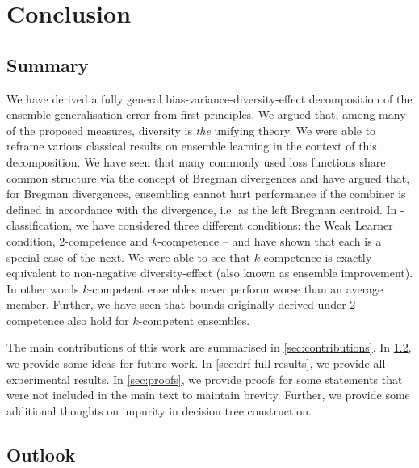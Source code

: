 \documentclass[
	twoside=false, %
]{kaobook}
\begin{document}
\chapter{Conclusion}

\section{Summary}

We have derived a fully general bias-variance-diversity-effect decomposition of the ensemble generalisation error from first principles. 
We argued that, among many of the proposed measures, diversity is \textit{the} unifying theory.
We were able to reframe various classical results on ensemble learning in the context of this decomposition. 
We have seen that many commonly used loss functions share common structure via the concept of Bregman divergences and have argued that, for Bregman divergences, ensembling cannot hurt performance if the combiner is defined in accordance with the divergence, i.e. as the left Bregman centroid. In \zeroone-classification, we have considered three different conditions: the Weak Learner condition, $2$-competence and $k$-competence -- and have shown that each is a special case of the next. We were able to see that $k$-competence is exactly equivalent to non-negative diversity-effect (also known as ensemble improvement). In other words $k$-competent ensembles never perform worse than an average member. Further, we have seen that bounds originally derived under $2$-competence also hold for $k$-competent ensembles. 

The main contributions of this work are summarised in \cref{sec:contributions}. In \cref{sec:outlook}, we provide some ideas for future work. In \cref{sec:drf-full-results}, we provide all experimental results. In \cref{sec:proofs}, we provide proofs for some statements that were not included in the main text to maintain brevity. Further, we provide some additional thoughts on impurity in decision tree construction.

\section{Outlook}
\label{sec:outlook}

\end{document}
